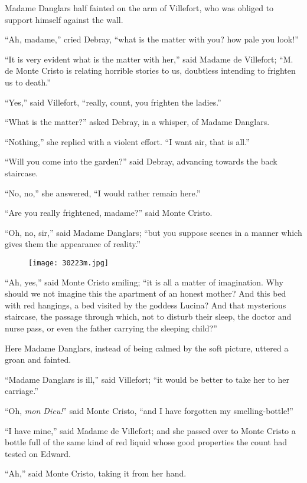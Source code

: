 Madame Danglars half fainted on the arm of Villefort, who was obliged
to support himself against the wall.

“Ah, madame,” cried Debray, “what is the matter with you? how pale you
look!”

“It is very evident what is the matter with her,” said Madame de
Villefort; “M. de Monte Cristo is relating horrible stories to us,
doubtless intending to frighten us to death.”

“Yes,” said Villefort, “really, count, you frighten the ladies.”

“What is the matter?” asked Debray, in a whisper, of Madame Danglars.

“Nothing,” she replied with a violent effort. “I want air, that is
all.”

“Will you come into the garden?” said Debray, advancing towards the
back staircase.

“No, no,” she answered, “I would rather remain here.”

“Are you really frightened, madame?” said Monte Cristo.

“Oh, no, sir,” said Madame Danglars; “but you suppose scenes in a
manner which gives them the appearance of reality.”

\begin{figure}[ht]
\texttt{[image: 30223m.jpg]}
\end{figure}

“Ah, yes,” said Monte Cristo smiling; “it is all a matter of
imagination. Why should we not imagine this the apartment of an honest
mother? And this bed with red hangings, a bed visited by the goddess
Lucina? And that mysterious staircase, the passage through which, not
to disturb their sleep, the doctor and nurse pass, or even the father
carrying the sleeping child?”

Here Madame Danglars, instead of being calmed by the soft picture,
uttered a groan and fainted.

“Madame Danglars is ill,” said Villefort; “it would be better to take
her to her carriage.”

“Oh, \textit{mon Dieu!}” said Monte Cristo, “and I have forgotten my
smelling-bottle!”

“I have mine,” said Madame de Villefort; and she passed over to Monte
Cristo a bottle full of the same kind of red liquid whose good
properties the count had tested on Edward.

“Ah,” said Monte Cristo, taking it from her hand.

